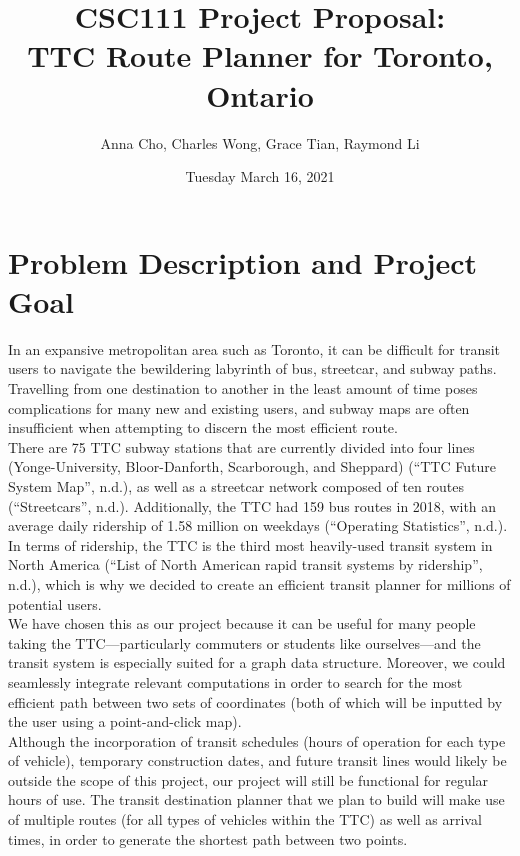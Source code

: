 \documentclass[fontsize=11pt]{article}
\title{CSC111 Project Proposal: \\
TTC Route Planner for Toronto, Ontario}
\author{Anna Cho, Charles Wong, Grace Tian, Raymond Li}
\date{Tuesday March 16, 2021}
\begin{document}
    \maketitle

    \section*{Problem Description and Project Goal}
    In an expansive metropolitan area such as Toronto, it can be difficult for transit users to navigate the bewildering labyrinth of bus, streetcar, and subway paths. Travelling from one destination to another in the least amount of time poses complications for many new and existing users, and subway maps are often insufficient when attempting to discern the most efficient route. \\

    There are 75 TTC subway stations that are currently divided into four lines (Yonge-University, Bloor-Danforth, Scarborough, and Sheppard) (“TTC Future System Map”, n.d.), as well as a streetcar network composed of ten routes (“Streetcars”, n.d.). Additionally, the TTC had 159 bus routes in 2018, with an average daily ridership of 1.58 million on weekdays (“Operating Statistics”, n.d.). In terms of ridership, the TTC is the third most heavily-used transit system in North America (“List of North American rapid transit systems by ridership”, n.d.), which is why we decided to create an efficient transit planner for millions of potential users. \\

    We have chosen this as our project because it can be useful for many people taking the TTC—particularly commuters or students like ourselves—and the transit system is especially suited for a graph data structure. Moreover, we could seamlessly integrate relevant computations in order to search for the most efficient path between two sets of coordinates (both of which will be inputted by the user using a point-and-click map). \\

    Although the incorporation of transit schedules (hours of operation for each type of vehicle), temporary construction dates, and future transit lines would likely be outside the scope of this project, our project will still be functional for regular hours of use. The transit destination planner that we plan to build will make use of multiple routes (for all types of vehicles within the TTC) as well as arrival times, in order to generate the shortest path between two points. \\
\end{document}
